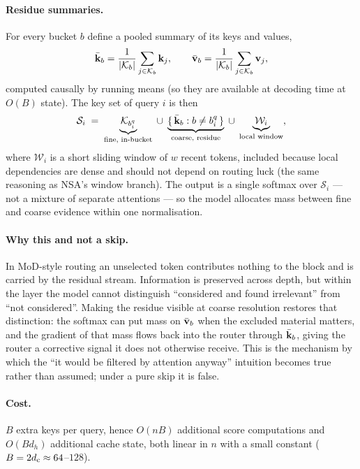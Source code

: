 \paragraph{Residue summaries.} For every bucket $b$ define a pooled summary of its keys and values,
\begin{equation}
  \bar{\mathbf{k}}_b = \frac{1}{|\mathcal{K}_b|}\sum_{j \in \mathcal{K}_b} \mathbf{k}_j, \qquad
  \bar{\mathbf{v}}_b = \frac{1}{|\mathcal{K}_b|}\sum_{j \in \mathcal{K}_b} \mathbf{v}_j,
\end{equation}
computed causally by running means (so they are available at decoding time at $O(B)$ state). The key set of query $i$ is then
\begin{equation}
  \mathcal{S}_i \;=\; \underbrace{\mathcal{K}_{b^q_i}}_{\text{fine, in-bucket}} \;\cup\; \underbrace{\{\, \bar{\mathbf{k}}_b : b \neq b^q_i \,\}}_{\text{coarse, residue}} \;\cup\; \underbrace{\mathcal{W}_i}_{\text{local window}},
\end{equation}
where $\mathcal{W}_i$ is a short sliding window of $w$ recent tokens, included because local dependencies are dense and should not depend on routing luck (the same reasoning as NSA's window branch). The output is a single softmax over $\mathcal{S}_i$ --- not a mixture of separate attentions --- so the model allocates mass between fine and coarse evidence within one normalisation.

\paragraph{Why this and not a skip.} In MoD-style routing an unselected token contributes nothing to the block and is carried by the residual stream. Information is preserved across depth, but within the layer the model cannot distinguish ``considered and found irrelevant'' from ``not considered''. Making the residue visible at coarse resolution restores that distinction: the softmax can put mass on $\bar{\mathbf{v}}_b$ when the excluded material matters, and the gradient of that mass flows back into the router through $\bar{\mathbf{k}}_b$, giving the router a corrective signal it does not otherwise receive. This is the mechanism by which the ``it would be filtered by attention anyway'' intuition becomes true rather than assumed; under a pure skip it is false.

\paragraph{Cost.} $B$ extra keys per query, hence $O(nB)$ additional score computations and $O(B d_h)$ additional cache state, both linear in $n$ with a small constant ($B = 2d_{\mathrm{c}} \approx 64$--$128$).

